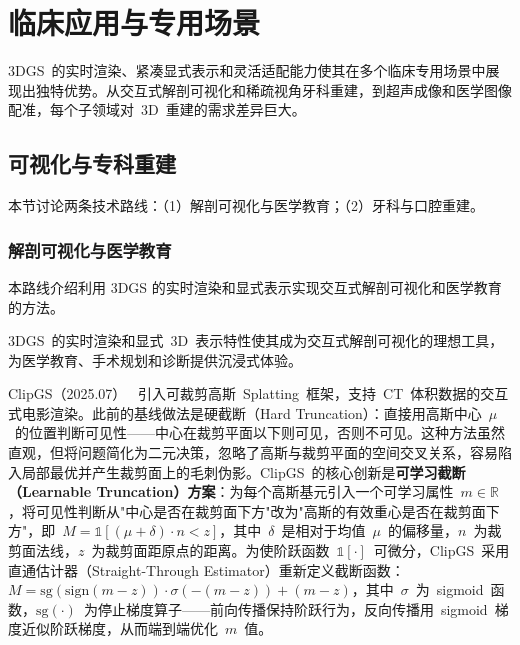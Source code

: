 

\section{临床应用与专用场景}
\label{sec:19_4}

3DGS~的实时渲染、紧凑显式表示和灵活适配能力使其在多个临床专用场景中展现出独特优势。从交互式解剖可视化和稀疏视角牙科重建，到超声成像和医学图像配准，每个子领域对~3D~重建的需求差异巨大。

\subsection{可视化与专科重建}
\label{ss:19_7}

本节讨论两条技术路线：（1）解剖可视化与医学教育；（2）牙科与口腔重建。

\subsubsection{解剖可视化与医学教育}

本路线介绍利用 3DGS 的实时渲染和显式表示实现交互式解剖可视化和医学教育的方法。

3DGS~的实时渲染和显式~3D~表示特性使其成为交互式解剖可视化的理想工具，为医学教育、手术规划和诊断提供沉浸式体验。

ClipGS（2025.07）~\cite{2507_06647} 引入可裁剪高斯~Splatting~框架，支持~CT~体积数据的交互式电影渲染。此前的基线做法是硬截断（Hard Truncation）：直接用高斯中心~$\mu$~的位置判断可见性——中心在裁剪平面以下则可见，否则不可见。这种方法虽然直观，但将问题简化为二元决策，忽略了高斯与裁剪平面的空间交叉关系，容易陷入局部最优并产生裁剪面上的毛刺伪影。ClipGS~的核心创新是\textbf{可学习截断（Learnable Truncation）方案}：为每个高斯基元引入一个可学习属性~$m \in \mathbb{R}$，将可见性判断从"中心是否在裁剪面下方"改为"高斯的有效重心是否在裁剪面下方"，即~$M = \mathbb{1}[(\mu + \delta) \cdot n < z]$，其中~$\delta$~是相对于均值~$\mu$~的偏移量，$n$~为裁剪面法线，$z$~为裁剪面距原点的距离。为使阶跃函数~$\mathbb{1}[\cdot]$~可微分，ClipGS~采用直通估计器（Straight-Through Estimator）重新定义截断函数：$M = \text{sg}(\text{sign}(m - z)) \cdot \sigma(-(m-z)) + (m-z)$，其中~$\sigma$~为~sigmoid~函数，$\text{sg}(\cdot)$~为停止梯度算子——前向传播保持阶跃行为，反向传播用~sigmoid~梯度近似阶跃梯度，从而端到端优化~$m$~值。

